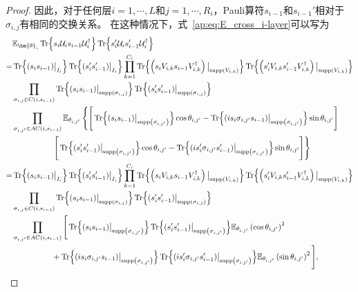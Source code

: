 \begin{lemma}
\begin{proof}
    因此，对于任何层$i=1,\cdots,L$和$j=1,\cdots,R_i$，Pauli算符$s_{i-1}$和$s_{i-1}'$相对于$\sigma_{i,j}$有相同的交换关系。 在这种情况下，式~\eqref{ap:eq:E_cross_i-layer}可以写为 
    \begin{equation}\label{ap:eq:E_cross_i-layer-rewrited}
        \begin{aligned}
        &\mathbb{E}_{\bm{\theta}_i}\Tr{s_i\mathcal{U}_i s_{i-1}\mathcal{U}_i^\dagger}\Tr{s'_i\mathcal{U}_i s'_{i-1}\mathcal{U}_i^\dagger}\\
        =&\Tr{(s_i s_{i-1})\big|_{I_i}}\Tr{(s'_i s'_{i-1})\big|_{I_i}}
        \prod_{k=1}^{C_i}\Tr{\left(s_iV_{i,k} s_{i-1}V_{i,k}^{\dagger}\right)\big|_\g{V_{i,k}}}\Tr{\left(s'_iV_{i,k} s'_{i-1}V_{i,k}^{\dagger}\right)\big|_\g{V_{i,k}}}\\
        &\prod_{\sigma_{i,j}\in C(i,s_{i-1})}\Tr{(s_i s_{i-1})\big|_{\g{\sigma_{i,j}}}}\Tr{(s'_i s'_{i-1})\big|_{\g{\sigma_{i,j}}}}\\
        &\prod_{\sigma_{i,j'}\in AC(i,s_{i-1})}\mathbb{E}_{\theta_{i,j'}}\left\{ \Bigg[ \Tr{(s_i s_{i-1})\big|_{\g{\sigma_{i,j'}}}}\cos{\theta_{i,j'}}
        - \Tr{(is_i \sigma_{i,j'}s_{i-1})\big|_{\g{\sigma_{i,j'}}}}\sin{\theta_{i,j'}}\Bigg]\right.\\
        &\left.\quad\quad\quad\quad\quad\Bigg[ \Tr{(s'_i s'_{i-1})\big|_{\g{\sigma_{i,j'}}}}\cos{\theta_{i,j'}}
        - \Tr{(is'_i \sigma_{i,j'}s'_{i-1})\big|_{\g{\sigma_{i,j'}}}}\sin{\theta_{i,j'}}\Bigg]\right\}\\
        =&\Tr{(s_i s_{i-1})\big|_{I_i}}\Tr{(s'_i s'_{i-1})\big|_{I_i}}
        \prod_{k=1}^{C_i}\Tr{\left(s_iV_{i,k} s_{i-1}V_{i,k}^{\dagger}\right)\big|_\g{V_{i,k}}}\Tr{\left(s'_iV_{i,k} s'_{i-1}V_{i,k}^{\dagger}\right)\big|_\g{V_{i,k}}}\\
        &\prod_{\sigma_{i,j}\in C(i,s_{i-1})}\Tr{(s_i s_{i-1})\big|_{\g{\sigma_{i,j}}}}\Tr{(s'_i s'_{i-1})\big|_{\g{\sigma_{i,j}}}}\\
        &\prod_{\sigma_{i,j'}\in AC(i,s_{i-1})}\Bigg[\Tr{(s_i s_{i-1})\big|_{\g{\sigma_{i,j'}}}}\Tr{(s'_i s'_{i-1})\big|_{\g{\sigma_{i,j'}}}}\mathbb{E}_{{\theta}_{i,j'}}\left(\cos{\theta_{i,j'}}\right)^2\\
        &\quad\quad\quad\quad\quad +\Tr{(is_i \sigma_{i,j'}s_{i-1})\big|_{\g{\sigma_{i,j'}}}}\Tr{(is'_i \sigma_{i,j'}s'_{i-1})\big|_{\g{\sigma_{i,j'}}}}\mathbb{E}_{{\theta}_{i,j'}}\left(\sin\theta_{i,j'}\right)^2\Bigg],
        \end{aligned}
    \end{equation}


\end{proof}
\end{lemma}
